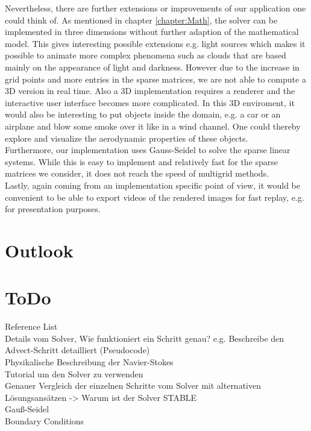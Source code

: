 \documentclass[a4paper,10pt,oneside,final,german,openbib,pdftex,titlepage]{scrbook}
\begin{document}
Nevertheless, there are further extensions or improvements of our application one could think of. As mentioned in chapter \ref{chapter:Math}, the solver can be implemented in three dimensions without further adaption of the mathematical model. This gives interesting possible extensions e.g. light sources which makes it possible to animate more complex phenomena such as clouds that are based mainly on the appearance of light and darkness. However due to the increase in grid points and more entries in the sparse matrices, we are not able to compute a 3D version in real time. Also a 3D implementation requires a renderer and the interactive user interface becomes more complicated. In this 3D enviroment, it would also be interesting to put objects inside the domain, e.g. a car or an airplane and blow some smoke over it like in a wind channel. One could thereby explore and visualize the aerodynamic properties of these objects.\\

Furthermore, our implementation uses Gauss-Seidel to solve the sparse linear systems. While this is easy to implement and relatively fast for the sparse matrices we consider, it does not reach the speed of multigrid methods.\\

Lastly, again coming from an implementation specific point of view, it would be convenient to be able to export videos of the rendered images for fast replay, e.g. for presentation purposes.
%
\chapter{Outlook}
\chapter{ToDo}
Reference List\\
Details vom Solver, Wie funktioniert ein Schritt genau? e.g. Beschreibe den Advect-Schritt detailliert (Pseudocode)\\
Physikalische Beschreibung der Navier-Stokes\\
Tutorial um den Solver zu verwenden\\
Genauer Vergleich der einzelnen Schritte vom Solver mit alternativen Lösungsansätzen -> Warum ist der Solver STABLE\\
Gauß-Seidel\\
Boundary Conditions\\
\end{document}
